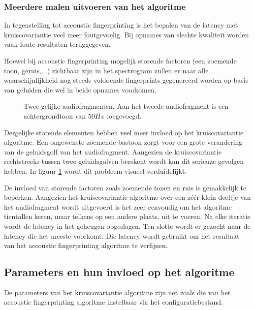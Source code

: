 \subsubsection{Meerdere malen uitvoeren van het algoritme}

In tegenstelling tot accoustic fingerprinting is het bepalen van de latency met kruiscovariantie veel meer foutgevoelig. Bij opnames van slechte kwaliteit worden vaak foute resultaten teruggegeven. 

Hoewel bij accoustic fingerprinting mogelijk storende factoren (een zoemende toon, geruis,...) zichtbaar zijn in het spectrogram zullen er naar alle waarschijnlijkheid nog steeds voldoende fingerprints gegenereerd worden op basis van geluiden die wel in beide opnames voorkomen. 

\begin{figure}[h!]
	\captionsetup{width=0.7\textwidth}
	\caption[Zoemtoon van $50 Hz$]{Twee gelijke audiofragmenten. Aan het tweede audiofragment is een achtergrondtoon van $50 Hz$ toegevoegd.}
	\begin{center}
		\advance\parskip0.3cm
		
	\end{center}
	\label{zoemtoon}
\end{figure}

Dergelijke storende elementen hebben veel meer invloed op het kruiscovariantie algoritme. Een ongewenste zoemende bastoon zorgt voor een grote verandering van de geluidsgolf van het audiofragment. Aangezien de kruiscovariantie rechtstreeks tussen twee geluidsgolven berekent wordt kan dit serieuze gevolgen hebben. In figuur \ref{zoemtoon} wordt dit probleem visueel verduidelijkt.

De invloed van storende factoren zoals zoemende tonen en ruis is gemakkelijk te beperken. Aangezien het kruiscovariantie algoritme over een zéér klein deeltje van het audiofragment wordt uitgevoerd is het zeer eenvoudig om het algoritme tientallen keren, maar telkens op een andere plaats, uit te voeren. Na elke iteratie wordt de latency in het geheugen opgeslagen. Ten slotte wordt er gezocht naar de latency die het meeste voorkomt. Die latency wordt gebruikt om het resultaat van het accoustic fingerprinting algoritme te verfijnen.

\subsection{Parameters en hun invloed op het algoritme}

De parameters van het kruiscovariantie algoritme zijn net zoals die van het accoustic fingerprinting algoritme instelbaar via het configuratiebestand.

